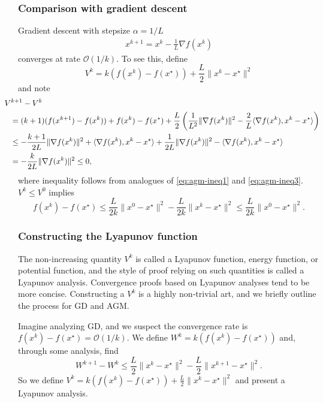 \documentclass[10pt,mathserif]{beamer}
\begin{document}
\begin{frame}
\frametitle{Comparison with gradient descent}
Gradient descent with stepsize $\alpha=1/L$
\begin{align*}
    x^{k+1} = x^k - \frac{1}{L}\nabla f(x^k)
\end{align*}
converges at rate $\mathcal{O}(1/k)$.
To see this, define
\[
V^{k}=k(f(x^k)-f(x^\star))+\frac{L}{2}\|x^k-x^\star\|^2
\]
and note
\begingroup\makeatletter\def\f@size{8}\check@mathfonts
\begin{align*}
&\hspace*{-0.25in}
V^{k+1}-V^k\\
&\hspace*{-0.15in}=(k+1)(f(x^{k+1})-f(x^k))+f(x^k)-f(x^\star)+\frac{L}{2}\left(\frac{1}{L^2}\|\nabla f(x^k)\|^2-\frac{2}{L}\langle \nabla f(x^k),x^k-x^\star\rangle \right)\\
&\hspace*{-0.15in}\le-\frac{k+1}{2L}\|\nabla f(x^k)\|^2+\langle \nabla f(x^k),x^k-x^\star\rangle+\frac{1}{2L}\|\nabla f(x^k)\|^2-\langle \nabla f(x^k),x^k-x^\star\rangle\\
&\hspace*{-0.15in}=-\frac{k}{2L}\|\nabla f(x^k)\|^2\le 0,
\end{align*}
\endgroup
where inequality follows from analogues of \eqref{eq:agm-ineq1} and \eqref{eq:agm-ineq3}.
$V^k\le V^0$ implies
\[
f(x^k)-f(x^\star)\le \frac{L}{2k}\|x^0-x^\star\|^2-\frac{L}{2k}\|x^k-x^\star\|^2 \le  \frac{L}{2k}\|x^0-x^\star\|^2.
\]
\end{frame}


\begin{frame}
\frametitle{Constructing the Lyapunov function}
The non-increasing quantity $V^k$ is called a Lyapunov function, energy function, or potential function, and the style of proof relying on such quantities is called a Lyapunov analysis. 
Convergence proofs based on Lyapunov analyses tend to be more concise.
Constructing a $V^k$ is a highly non-trivial art, and we briefly outline the process for GD and AGM.

\vspace{0.2in}

Imagine analyzing GD, and we suspect the convergence rate is $f(x^k) - f(x^\star) = \mathcal{O}(1/k)$.
We define $W^k=k(f(x^k)-f(x^\star))$ and, through some analysis, find
\[
W^{k+1}-W^k \le
\frac{L}{2}\|x^k - x^\star\|^2-\frac{L}{2}\|x^{k+1} - x^\star\|^2.
\]
So we define $V^k=k(f(x^k)-f(x^\star))+\frac{L}{2}\|x^k-x^\star\|^2$ and present a Lyapunov analysis.

\end{frame}
\end{document}
